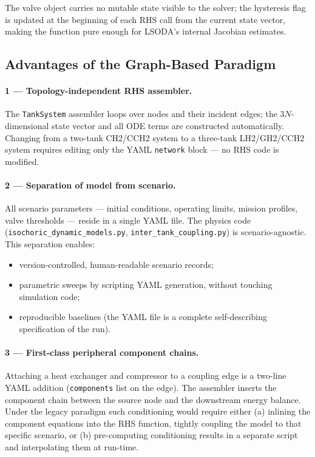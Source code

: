 The valve object carries no mutable state visible to the solver; the hysteresis
flag is updated at the beginning of each RHS call from the current state vector,
making the function pure enough for LSODA's internal Jacobian estimates.

\subsection{Advantages of the Graph-Based Paradigm}
\label{sec:comparison:advantages}

\paragraph{1 --- Topology-independent RHS assembler.}
The \texttt{TankSystem} assembler loops over nodes and their incident edges; the
$3N$-dimensional state vector and all ODE terms are constructed automatically.
Changing from a two-tank CH2/CCH2 system to a three-tank LH2/GH2/CCH2 system
requires editing only the YAML \texttt{network} block --- no RHS code is
modified.

\paragraph{2 --- Separation of model from scenario.}
All scenario parameters --- initial conditions, operating limits, mission
profiles, valve thresholds --- reside in a single YAML file.  The physics code
(\texttt{isochoric\_dynamic\_models.py}, \texttt{inter\_tank\_coupling.py})
is scenario-agnostic.  This separation enables:
\begin{itemize}
  \item version-controlled, human-readable scenario records;
  \item parametric sweeps by scripting YAML generation, without touching
    simulation code;
  \item reproducible baselines (the YAML file is a complete self-describing
    specification of the run).
\end{itemize}

\paragraph{3 --- First-class peripheral component chains.}
Attaching a heat exchanger and compressor to a coupling edge is a two-line YAML
addition (\texttt{components} list on the edge).  The assembler inserts the
component chain between the source node and the downstream energy balance.
Under the legacy paradigm such conditioning would require either (a) inlining
the component equations into the RHS function, tightly coupling the model to
that specific scenario, or (b) pre-computing conditioning results in a separate
script and interpolating them at run-time.

